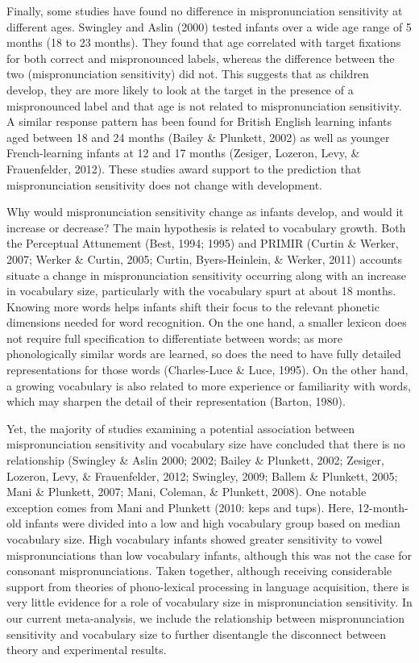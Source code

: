 \documentclass[man]{apa6}
\theoremstyle{definition}
\theoremstyle{definition}
\theoremstyle{definition}
\theoremstyle{remark}
\begin{document}
Finally, some studies have found no difference in mispronunciation
sensitivity at different ages. Swingley and Aslin (2000) tested infants
over a wide age range of 5 months (18 to 23 months). They found that age
correlated with target fixations for both correct and mispronounced
labels, whereas the difference between the two (mispronunciation
sensitivity) did not. This suggests that as children develop, they are
more likely to look at the target in the presence of a mispronounced
label and that age is not related to mispronunciation sensitivity. A
similar response pattern has been found for British English learning
infants aged between 18 and 24 months (Bailey \& Plunkett, 2002) as well
as younger French-learning infants at 12 and 17 months (Zesiger,
Lozeron, Levy, \& Frauenfelder, 2012). These studies award support to
the prediction that mispronunciation sensitivity does not change with
development.

Why would mispronunciation sensitivity change as infants develop, and
would it increase or decrease? The main hypothesis is related to
vocabulary growth. Both the Perceptual Attunement (Best, 1994; 1995) and
PRIMIR (Curtin \& Werker, 2007; Werker \& Curtin, 2005; Curtin,
Byers-Heinlein, \& Werker, 2011) accounts situate a change in
mispronunciation sensitivity occurring along with an increase in
vocabulary size, particularly with the vocabulary spurt at about 18
months. Knowing more words helps infants shift their focus to the
relevant phonetic dimensions needed for word recognition. On the one
hand, a smaller lexicon does not require full specification to
differentiate between words; as more phonologically similar words are
learned, so does the need to have fully detailed representations for
those words (Charles-Luce \& Luce, 1995). On the other hand, a growing
vocabulary is also related to more experience or familiarity with words,
which may sharpen the detail of their representation (Barton, 1980).

Yet, the majority of studies examining a potential association between
mispronunciation sensitivity and vocabulary size have concluded that
there is no relationship (Swingley \& Aslin 2000; 2002; Bailey \&
Plunkett, 2002; Zesiger, Lozeron, Levy, \& Frauenfelder, 2012; Swingley,
2009; Ballem \& Plunkett, 2005; Mani \& Plunkett, 2007; Mani, Coleman,
\& Plunkett, 2008). One notable exception comes from Mani and Plunkett
(2010: keps and tups). Here, 12-month-old infants were divided into a
low and high vocabulary group based on median vocabulary size. High
vocabulary infants showed greater sensitivity to vowel mispronunciations
than low vocabulary infants, although this was not the case for
consonant mispronunciations. Taken together, although receiving
considerable support from theories of phono-lexical processing in
language acquisition, there is very little evidence for a role of
vocabulary size in mispronunciation sensitivity. In our current
meta-analysis, we include the relationship between mispronunciation
sensitivity and vocabulary size to further disentangle the disconnect
between theory and experimental results.
\end{document}
